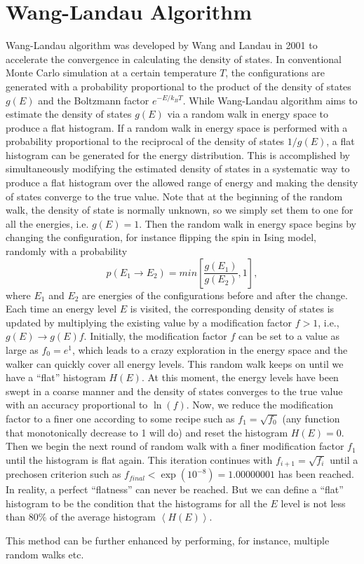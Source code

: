 \section{Wang-Landau Algorithm\label{Sec:ES:Wang-Landau}}
Wang-Landau algorithm was developed by Wang and Landau in 2001 to accelerate the convergence in calculating the density of states.\cite{WangPRL2001} In conventional Monte Carlo simulation at a certain temperature $T$, the configurations are generated with a probability proportional to the product of the density of states $g(E)$ and the Boltzmann factor $e^{-E/k_BT}$. While Wang-Landau algorithm aims to estimate the density of states $g(E)$ via a random walk in energy space to produce a flat histogram. If a random walk in energy space is performed with a probability proportional to the reciprocal of the density of states $1/g(E)$, a flat histogram can be generated for the energy distribution. This is accomplished by simultaneously modifying the estimated density of states in a systematic way to produce a flat histogram over the allowed range of energy and making the density of states converge to the true value. Note that at the beginning of the random walk, the density of state is normally unknown, so we simply set them to one for all the energies, i.e. $g(E)=1$. Then the random walk in energy space begins by changing the configuration, for instance flipping the spin in Ising model, randomly with a probability
\begin{equation}
    p(E_1\to E_2)=min\left[\frac{g(E_1)}{g(E_2)},1\right],
\end{equation}
where $E_1$ and $E_2$ are energies of the configurations before and after the change. Each time an energy level $E$ is visited, the corresponding density of states is updated by multiplying the existing value by a modification factor $f>1$, i.e., $g(E)\to g(E)f$. Initially, the modification factor $f$ can be set to a value as large as $f_0=e^1$, which leads to a crazy exploration in the energy space and the walker can quickly cover all energy levels. This random walk keeps on until we have a ``flat'' histogram $H(E)$. At this moment, the energy levels have been swept in a coarse manner and the density of states converges to the true value with an accuracy proportional to $\ln{(f)}$. Now, we reduce the modification factor to a finer one according to some recipe such as $f_1=\sqrt{f_0}$ (any function that monotonically decrease to 1 will do) and reset the histogram $H(E)=0$. Then we begin the next round of random walk with a finer modification factor $f_1$ until the histogram is flat again. This iteration continues with $f_{i+1}=\sqrt{f_i}$ until a prechosen criterion such as $f_{final}<\exp(10^{-8})=1.00000001$ has been reached. In reality, a perfect ``flatness'' can never be reached. But we can define a ``flat'' histogram to be the condition that the histograms for all the $E$ level is not less than 80\% of the average histogram $\left<H(E)\right>$.

This method can be further enhanced by performing, for instance, multiple random walks etc.